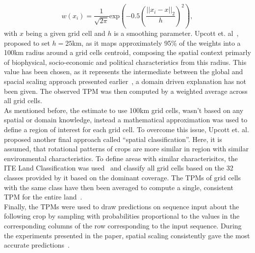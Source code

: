 \documentclass{Academic}
\begin{document}
    \[w(x_i) = \frac{1}{\sqrt{2\pi}}\mathrm{exp}(-0.5(\frac{||x_i - x||_2}{h})^2),\]
    with $x$ being a given grid cell and $h$ is a smoothing parameter. Upcott et. al~\cite{upcott_new_2023}, proposed to set $h=25$km, as it maps approximately 95\% of the weights into a 100km radius around a grid cells centroid, composing the spatial context primarly of biophysical, socio-economic and political characteristics from this radius. This value has been chosen, as it represents the intermediate between the global and spacial scaling approach presented earlier~\cite{upcott_new_2023}, a domain driven explanation has not been given. The observed TPM was then computed by a weighted average across all grid cells.\\
    As mentioned before, the estimate to use 100km grid cells, wasn't based on any spatial or domain knowledge, instead a mathematical approximation was used to define a region of interest for each grid cell. To overcome this issue, Upcott et. al. proposed another final approach called \enquote{spatial classification}. Here, it is assumed, that rotational patterns of crops are more similar in region with similar environmental characteristics. To define areas with similar characterisitcs, the ITE Land Classification was used~\cite{upcott_new_2023} and classify all grid cells based on the 32 classes provided by it based on the dominant coverage. The TPMs of grid cells with the same class have then been averaged to compute a single, consistent TPM for the entire land~\cite{upcott_new_2023}.\\
    Finally, the TPMs were used to draw predictions on sequence input about the following crop by sampling with probabilities proportional to the values in the corresponding columns of the row corresponding to the input sequence. During the experiments presented in the paper, spatial scaling consistently gave the most accurate predictions~\cite{upcott_new_2023}.
\end{document}
